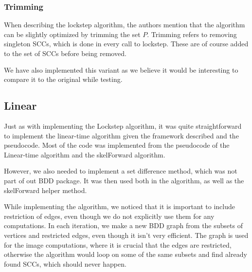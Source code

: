 \documentclass[../master/master.tex]{subfiles}
\begin{document}
\subsubsection{Trimming}
When describing the lockstep algorithm\cite{lockstep}, the authors mention that the algorithm can be slightly optimized by trimming the set $P$. Trimming refers to removing singleton SCCs, which is done in every call to lockstep. These are of course added to the set of SCCs before being removed.

We have also implemented this variant as we believe it would be interesting to compare it to the original while testing. 

\subsection{Linear}
Just as with implementing the Lockstep algorithm, it was quite straightforward to implement the linear-time algorithm given the framework described and the pseudocode. Most of the code was implemented from the pseudocode of the Linear-time algorithm and the skelForward algorithm.

However, we also needed to implement a set difference method, which was not part of out BDD package. It was then used both in the algorithm, as well as the skelForward helper method.

While implementing the algorithm, we noticed that it is important to include restriction of edges, even though we do not explicitly use them for any computations. In each iteration, we make a new BDD graph from the subsets of vertices and restricted edges, even though it isn't very efficient. The graph is used for the image computations, where it is crucial that the edges are restricted, otherwise the algorithm would loop on some of the same subsets and find already found SCCs, which should never happen.
\end{document}
